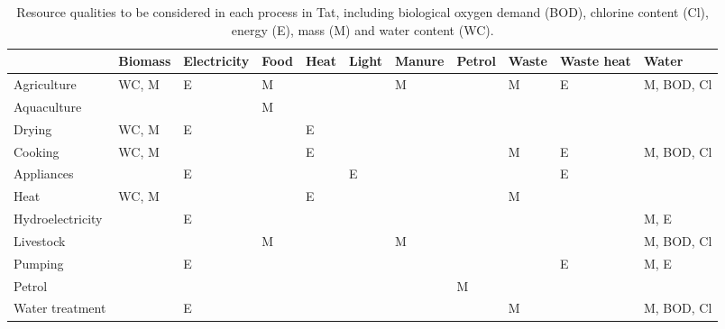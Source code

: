\begin{sidewaystable}[htbp]
	\centering
	\caption{Resource qualities to be considered in each process in Tat, including biological oxygen demand (BOD), chlorine content (Cl), energy (E), mass (M) and water content (WC).} \label{tab:quality_catalogue}
	\begin{tabular}{lllllllllll}
		\toprule
		& Biomass & Electricity & Food & Heat & Light & Manure & Petrol & Waste & Waste heat & Water \\
		\midrule
		Agriculture & WC, M & E & M & & & M & & M & E & M, BOD, Cl \\
		Aquaculture & & & M & & & & & & & \\
		Drying & WC, M & E &  & E & & & & & & \\
		Cooking & WC, M & & & E & & & & M & E & M, BOD, Cl \\
		Appliances & & E & & & E & & & & E & \\
		Heat & WC, M & & & E & & & & M & & \\
		Hydroelectricity & & E & & & & & & & & M, E \\
		Livestock & & & M & & & M & & & & M, BOD, Cl \\
		Pumping & & E & & & & & & & E & M, E \\
		Petrol & & & & & & & M & & & \\
		Water treatment & & E & & & & & & M & & M, BOD, Cl \\
		\bottomrule
	\end{tabular}
\end{sidewaystable}
